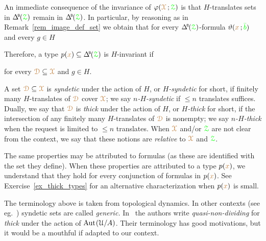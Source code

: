 An immediate consequence of the invariance of $\varphi({\color{brown}\EuScript X}\,;{\color{green}\EuScript Z})$ is that $H$-translates sets in $\BDelta({\grZ})$ remain in $\BDelta({\grZ})$.
In particular, by reasoning as in Remark~\ref{rem_image_def_set} we obtain that for every $\BDelta({\grZ})$-formula $\vartheta({\color{brown} x}\,;{\color{green}\bar b})$ and every $g\in H$


Therefore, a type $p({\mr x})\subseteq\BDelta(\grZ)$ is $H$-invariant if

\hfill for every ${\color{brown}\EuScript D}\subseteq{\color{brown}\EuScript X}$ and $g\in H$.


A set ${\color{brown}\EuScript D}\subseteq{\color{brown}\EuScript X}$ is \emph{syndetic\/} under the action of $H$, or \emph{$H$-syndetic\/} for short, if finitely many $H$-translates of ${\color{brown}\EuScript D}$ cover ${\color{brown}\EuScript X}$; we say \emph{$n$-$H$-syndetic\/} if $\le n$ translates suffices.
Dually, we say that ${\color{brown}\EuScript D}$ is \emph{thick\/} under the action of $H$, or \emph{$H$-thick\/} for short, if the intersection of any finitely many $H$-translates of ${\color{brown}\EuScript D}$ is nonempty; we say \emph{$n$-$H$-thick\/} when the request is limited to $\le n$ translates.
When ${\color{brown}\EuScript X}$ and/or ${\color{green}\EuScript Z}$ are not clear from the context, we say that these notions are \emph{relative\/} to ${\color{brown}\EuScript X}$ and ${\color{green}\EuScript Z}$.

The same properties may be attributed to formulas (as these are identified with the set they define).
When these properties are attributed to a type $p({\color{brown} x})$, we understand that they hold for every conjunction of formulas in $p({\color{brown} x})$.
See Exercise~\ref{ex_thick_types} for an alternative characterization when $p({\color{brown} x})$ is small.

\noindent\llap{\textcolor{red}{\Large\warning}\kern1.5ex}\ignorespaces
The terminology above is taken from topological dynamics.
In other contexts (see eg.~\cite{Newelski09}) syndetic sets are called \textit{generic.}
In~\cite{CK} the authors write \textit{quasi-non-dividing\/} for \textit{thick\/} under the action of ${\rm Aut\kern.15ex}(\EuScript U/A)$.
Their terminology has good motivations, but it would be a mouthful if adapted to our context.

